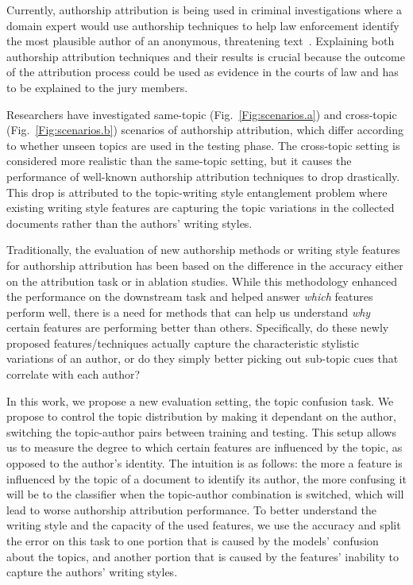 \documentclass[11pt]{article}
\begin{document}
Currently, authorship attribution is being used in criminal investigations where a domain expert would use authorship techniques to help law enforcement identify the most plausible author of an anonymous, threatening text~\citep{Ding.S:2015,rocha2016authorship}. Explaining both authorship attribution techniques and their results is crucial because the outcome of the attribution process could be used as evidence in the courts of law and has to be explained to the jury members.

Researchers have investigated same-topic (Fig.~\ref{Fig:scenarios.a}) and cross-topic (Fig.~\ref{Fig:scenarios.b}) scenarios of authorship attribution, which differ according to whether unseen topics are used in the testing phase. The cross-topic setting is considered more realistic than the same-topic setting, but it causes the performance of well-known authorship attribution techniques to drop drastically. This drop is attributed to the topic-writing style entanglement problem where existing writing style features are capturing the topic variations in the collected documents rather than the authors' writing styles. 

Traditionally, the evaluation of new authorship methods or writing style features for authorship attribution has been based on the difference in the accuracy either on the attribution task or in ablation studies. While this methodology enhanced the performance on the downstream task and helped answer \textit{which} features perform well, there is a need for methods that can help us understand \textit{why} certain features are performing better than others. Specifically, do these newly proposed features/techniques actually capture the characteristic stylistic variations of an author, or do they simply better picking out sub-topic cues that correlate with each author?  %

In this work, we propose a new evaluation setting, the topic confusion task. We propose to control the topic distribution by making it dependant on the author, switching the topic-author pairs between training and testing. This setup allows us to measure the degree to which certain features are influenced by the topic, as opposed to the author's identity. The intuition is as follows: the more a feature is influenced by the topic of a document to identify its author, the more confusing it will be to the classifier when the topic-author combination is switched, which will lead to worse authorship attribution performance. To better understand the writing style and the capacity of the used features, we use the accuracy and split the error on this task to one portion that is caused by the models' confusion about the topics, and another portion that is caused by the features' inability to capture the authors' writing styles.
\end{document}
